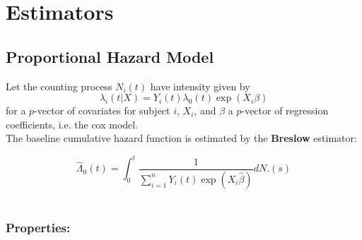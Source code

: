 \section*{Estimators}
\subsection*{Proportional Hazard Model}
Let the counting process $N_i(t)$ have intensity given by 
$$\lambda_i(t | X) = Y_i(t) \lambda_0(t)\exp(X_i\beta)$$
for a $p$-vector of covariates for subject $i$, $X_i$, and $\beta$ a $p$-vector of regression coefficients, i.e. the cox model.\\ 
The baseline cumulative hazard function is estimated by the \textbf{Breslow} estimator:

$$
\hat{\Lambda}_0(t) = \int_0^t \frac{1}{\sum_{i=1}^nY_i(t)\exp(X_i\hat{\beta})} dN.(s)
$$\\

\subsubsection*{Properties:}



